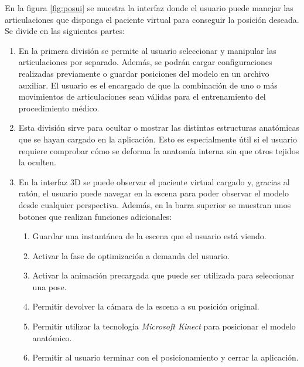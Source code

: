 En la figura \ref{fig:posui} se muestra la interfaz donde el usuario puede manejar las articulaciones que disponga el paciente virtual para conseguir la posición deseada. Se divide en las siguientes partes: 
\begin{enumerate}
    \item En la primera división se permite al usuario seleccionar y manipular las articulaciones por separado. %
    Además, se podrán cargar configuraciones realizadas previamente o guardar posiciones del modelo en un archivo auxiliar. El usuario es el encargado de que la combinación de uno o más movimientos de articulaciones sean válidas para el entrenamiento del procedimiento médico. 
    \item Esta división sirve para ocultar o mostrar las distintas estructuras anatómicas que se hayan cargado en la aplicación. Esto es especialmente útil si el usuario requiere comprobar cómo se deforma la anatomía interna sin que otros tejidos la oculten. %
    \item En la interfaz 3D se puede observar el paciente virtual cargado y, gracias al ratón, el usuario puede navegar en la escena para poder observar el modelo desde cualquier perspectiva. Además, en la barra superior se muestran unos botones que realizan funciones adicionales:
    \begin{enumerate}
   \item Guardar una instantánea de la escena que el usuario está viendo. 
   \item Activar la fase de optimización a demanda del usuario. 
   \item Activar la animación precargada que puede ser utilizada para seleccionar una pose. 
   \item Permitir devolver la cámara de la escena a su posición original. 
   \item Permitir utilizar la tecnología \emph{Microsoft Kinect} para posicionar el modelo anatómico.
   \item   Permitir al usuario terminar con el posicionamiento y cerrar la aplicación.
    \end{enumerate}
    
\end{enumerate}




